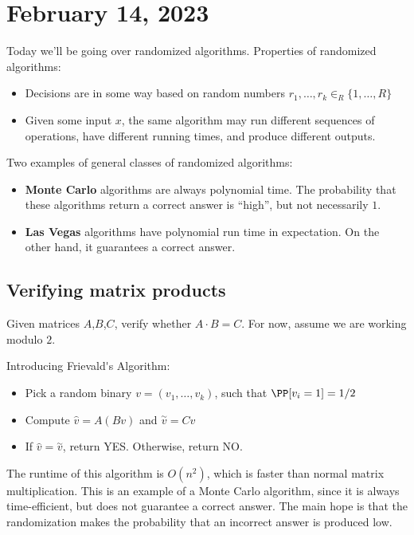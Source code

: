 \section{February 14, 2023}

Today we'll be going over randomized algorithms. Properties of randomized algorithms:
\begin{itemize}
    \item Decisions are in some way based on random numbers $r_1, \hdots, r_k\in_R \{1, \hdots, R\}$
    \item Given some input $x$, the same algorithm may run different sequences of operations, have different running times, and produce different outputs. 
\end{itemize}
Two examples of general classes of randomized algorithms:
\begin{itemize}
    \item \textbf{Monte Carlo} algorithms are always polynomial time. The probability that these algorithms return a correct answer is ``high'', but not necessarily $1$.
    \item \textbf{Las Vegas} algorithms have polynomial run time in expectation. On the other hand, it guarantees a correct answer. 
\end{itemize}

\subsection{Verifying matrix products}

Given matrices $A$,$B$,$C$, verify whether $A\cdot B = C$. For now, assume we are working modulo $2$. 
\hrulebar

Introducing \ac{Frievald's Algorithm}:
\begin{itemize}
    \item Pick a random binary $v = (v_1, \hdots, v_k)$, such that $\PP[v_i=1] = 1/2$
    \item Compute $\hat{v} = A(Bv)$ and $\overset{\sim}{v} = Cv$
    \item If $\hat{v} = \overset{\sim}{v}$, return YES. Otherwise, return NO. 
\end{itemize}
The runtime of this algorithm is $O(n^2)$, which is faster than normal matrix multiplication. This is an example of a Monte Carlo algorithm, since it is always time-efficient, but does not guarantee a correct answer. The main hope is that the randomization makes the probability that an incorrect answer is produced low. 

